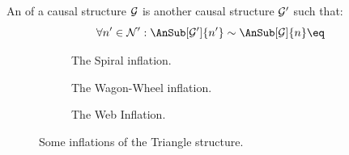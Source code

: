\documentclass[aps, 10pt, english, twoside, pra, nofootinbib, tightenlines, longbibliography, superscriptaddress]{revtex4-1}
\begin{document}
    \begin{definition}
        \label{def:inflation}
        An  of a causal structure $\mathcal{G}$ is another causal structure $\mathcal{G}'$ such that:
        \[ \forall n' \in \nodes': \AnSub[\graph']{n'} \sim \AnSub[\graph]{n} \eq \label{eq:inflation_defn}\]
    \end{definition}
    \begin{center}
    \begin{figure}
    \begin{subfigure}[b]{.30\linewidth}
    \scalebox{0.65}{}
    \caption{The Spiral inflation.}\label{fig:spiral_inflation}
    \end{subfigure}
    \begin{subfigure}[b]{.30\linewidth}
    \scalebox{0.65}{}
    \caption{The Wagon-Wheel inflation.}\label{fig:wagon_wheel_inflation}
    \end{subfigure}
    \begin{subfigure}[b]{.30\linewidth}
    \scalebox{0.65}{}
    \caption{The Web Inflation.}\label{fig:the_web_inflation}
    \end{subfigure}
    \caption{Some inflations of the Triangle structure.}
    \label{fig:inflations}
    \end{figure}
    \end{center}
\end{document}
